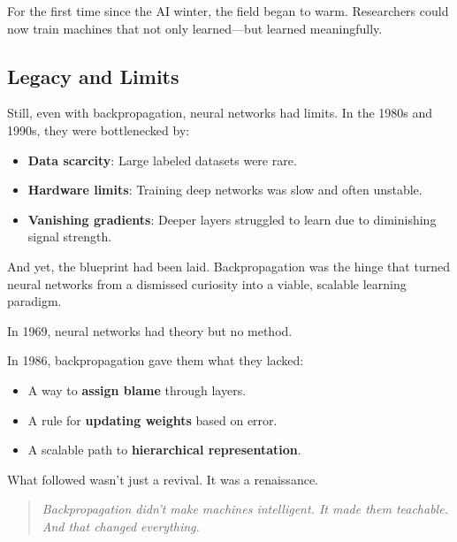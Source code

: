 For the first time since the AI winter, the field began to warm. Researchers could now train machines that not only learned—but learned meaningfully.

\subsection{Legacy and Limits}

Still, even with backpropagation, neural networks had limits. In the 1980s and 1990s, they were bottlenecked by:

\begin{itemize}
  \item \textbf{Data scarcity}: Large labeled datasets were rare.
  \item \textbf{Hardware limits}: Training deep networks was slow and often unstable.
  \item \textbf{Vanishing gradients}: Deeper layers struggled to learn due to diminishing signal strength.
\end{itemize}

And yet, the blueprint had been laid. Backpropagation was the hinge that turned neural networks from a dismissed curiosity into a viable, scalable learning paradigm.

\begin{tcolorbox}[colback=blue!5!white, colframe=blue!50!black,
title={Backpropagation: What Minsky and Papert Were Missing}]
In 1969, neural networks had theory but no method.

In 1986, backpropagation gave them what they lacked:
\begin{itemize}
  \item A way to \textbf{assign blame} through layers.
  \item A rule for \textbf{updating weights} based on error.
  \item A scalable path to \textbf{hierarchical representation}.
\end{itemize}

What followed wasn’t just a revival. It was a renaissance.
\end{tcolorbox}

\begin{quote}
\textit{Backpropagation didn’t make machines intelligent.  
It made them teachable. And that changed everything.}
\end{quote}
